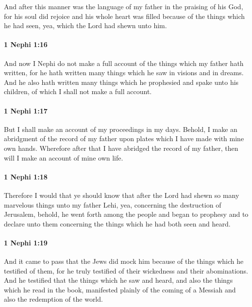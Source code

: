 			And after this manner was the language of my father in the praising of his God,
			for his soul did rejoice and his whole heart was filled
			because of the things which he had seen,
			yea, which the Lord had shewn unto him.

		\paragraph{1 Nephi 1:16} %
			\label{1NEPHI-1-16}

			And now I Nephi do not make a full account of the things
			which my father hath written,
			for he hath written many things which he saw in visions and in dreams.
			And he also hath written many things
			which he prophesied and spake unto his children,
			of which I shall not make a full account.

		\paragraph{1 Nephi 1:17} %
			\label{1NEPHI-1-17}

			But I shall make an account of my proceedings in my days.
			Behold, I make an abridgment of the record of my father
			upon plates which I have made with mine own hands.
			Wherefore after that I have abridged the record of my father,
			then will I make an account of mine own life.

		\paragraph{1 Nephi 1:18} %
			\label{1NEPHI-1-18}

			Therefore I would that ye should know that
			after the Lord had shewn so many marvelous things unto my father Lehi,
			yea, concerning the destruction of Jerusalem,
			behold, he went forth among the people and began to prophesy
			and to declare unto them concerning the things
			which he had both seen and heard.

		\paragraph{1 Nephi 1:19} %
			\label{1NEPHI-1-19}

			And it came to pass that the Jews did mock him
			because of the things which he testified of them,
			for he truly testified of their wickedness and their abominations.
			And he testified that the things which he saw and heard,
			and also the things which he read in the book,
			manifested plainly of the coming of a Messiah
			and also the redemption of the world.

